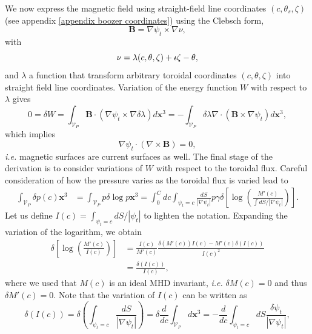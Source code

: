 \documentclass[my_thesis.tex]{subfiles}
\begin{document}
We now express the magnetic field using straight-field line coordinates $(c,\theta_s,\zeta)$ (see appendix \ref{appendix boozer coordinates}) using the Clebsch form,
\begin{equation}
	\mathbf{B} = \nabla\psi_t\times\nabla\nu,
\end{equation}
with
\begin{equation}
	\nu = \lambda(c,\theta,\zeta) + \text{$\iota\!\!$-}\zeta - \theta,
\end{equation}
and $\lambda$ a function that transform arbitrary toroidal coordinates $(c,\theta,\zeta)$ into straight field line coordinates. Variation of the energy function $W$ with respect to $\lambda$ gives
\begin{equation}
	0=\delta W = \int_{\mathcal{V}_P}\mathbf{B}\cdot(\nabla\psi_t\times\nabla\delta\lambda)d\mathbf{x}^3=-\int_{\mathcal{V}_P} \delta\lambda\nabla\cdot(\mathbf{B}\times\nabla\psi_t)d\mathbf{x}^3,
\end{equation}
which implies
\begin{equation}
	\nabla\psi_t\cdot(\nabla\times\mathbf{B})=0,
\end{equation}
\textit{i.e.} magnetic surfaces are current surfaces as well. The final stage of the derivation is to consider variations of $W$ with respect to the toroidal flux. Careful consideration of how the pressure varies as the toroidal flux is varied lead to
\begin{align}
	\int_{\mathcal{V}_P} \delta p(c) \mathbf{x}^3 &= \int_{\mathcal{V}_P}p  \delta \log p\mathbf{x}^3 = \int_0^C dc \int_{\psi_t=c} \frac{dS}{|\nabla\psi_t|} p \gamma \delta\left[\log \left(\frac{M'(c)}{\int dS/|\nabla\psi_t|}\right)\right].
\end{align}
Let us define $I(c)=\int_{\psi_t=c}dS/|\psi_t|$ to lighten the notation. Expanding the variation of the logarithm, we obtain
\begin{align}
	\delta\left[\log\left(\frac{M'(c)}{I(c)}\right)\right] &= \frac{I(c)}{M'(c)} \frac{\delta(M'(c))I(c) - M'(c)\delta(I(c))}{I(c)^2} \\
	&= \frac{\delta(I(c))}{I(c)},
\end{align}
where we used that $M(c)$ is an ideal MHD invariant, \textit{i.e.} $\delta M(c)=0$ and thus $\delta M'(c)=0$. Note that the variation of $I(c)$ can be written as
\begin{equation}
	\delta(I(c)) = \delta\left(\int_{\psi_t=c}\frac{dS}{|\nabla\psi_t|}\right) = \delta \frac{d}{dc}\int_{\mathcal{V}_P}d\mathbf{x}^3 = -\frac{d}{dc}\int_{\psi_t=c}dS\frac{\delta\psi_t}{|\nabla\psi_t|},
\end{equation}
\end{document}
